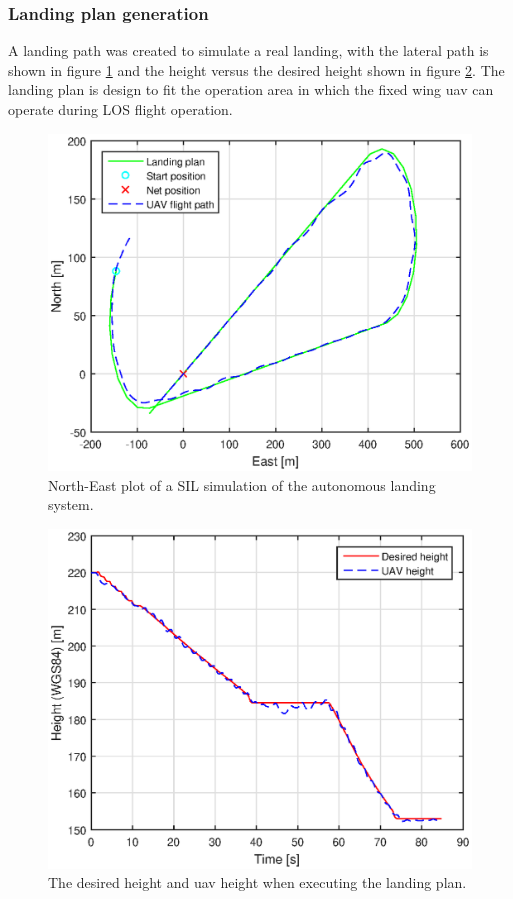 \subsubsection{Landing plan generation}
A landing path was created to simulate a real landing, with the lateral path is shown in figure \ref{Fig:SILNorthEast090145} and the height versus the desired height  shown in figure \ref{Fig:SILHeight6juni090145}. The landing plan is design to fit the operation area in which the fixed wing \gls{uav} can operate during LOS flight operation.
\begin{figure}[H]
\centering
\includegraphics[scale=0.7]{figs/SysPlot/SILNorthEast6juni090145.eps}
\caption{North-East plot of a SIL simulation of the autonomous landing system.}
\label{Fig:SILNorthEast090145}
\end{figure}
\begin{figure}[H]
\centering
\includegraphics[scale=0.7]{figs/SysPlot/SILHeight6juni090145.eps}
\caption{The desired height and \gls{uav} height when executing the landing plan.}
\label{Fig:SILHeight6juni090145}
\end{figure}
